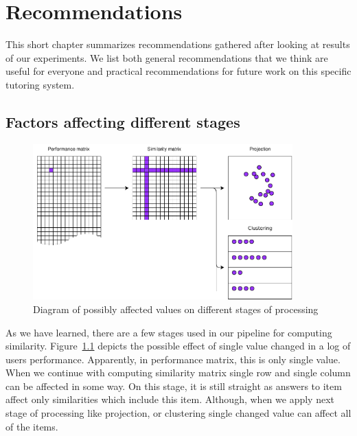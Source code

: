 \documentclass[
  printed, %
  table,   %
  nolof,     %
  nolot,     %
  color,
  final,
  nocover
]{fithesis3}
\begin{document}

\chapter{Recommendations}\label{recommendations}


This short chapter summarizes recommendations gathered after looking at results of our experiments. We list both general recommendations that we think are useful for everyone and practical recommendations for future work on this specific tutoring system.


\section{Factors affecting different stages}\label{factors-affecting-different-stages}

\begin{figure}
  \includegraphics[width=10cm]{img/affected_diagram}
  \caption{Diagram of possibly affected values on different stages of processing}
  \label{fig:affected_diagram}
\end{figure}


As we have learned, there are a few stages used in our pipeline for computing similarity. Figure~\ref{fig:affected_diagram} depicts the possible effect of single value changed in a log of users performance. Apparently, in performance matrix, this is only single value. When we continue with computing similarity matrix single row and single column can be affected in some way. On this stage, it is still straight as answers to item affect only similarities which include this item. Although, when we apply next stage of processing like projection, or clustering single changed value can affect all of the items.
\end{document}
